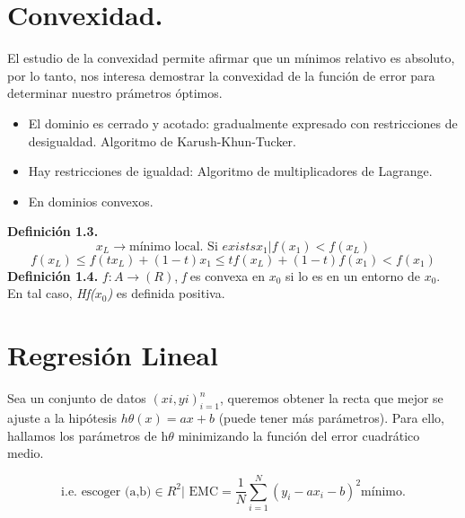 \documentclass[a4paper,10pt]{article}
\begin{document}
\section{Convexidad.}
\noindent
El estudio de la convexidad permite afirmar que un mínimos relativo es absoluto, por lo tanto, nos interesa demostrar la convexidad de la función de error para determinar nuestro prámetros óptimos.

\begin{itemize}
\item El dominio es cerrado y acotado: gradualmente expresado con restricciones de desigualdad. Algoritmo de Karush-Khun-Tucker.
\item Hay restricciones de igualdad: Algoritmo de multiplicadores de Lagrange.
\item En dominios convexos.
\end{itemize}
\textbf{Definición 1.3.} 
\[x_{L} \rightarrow \text{mínimo local. Si } exists x_{1} |  f(x_{1}) < f(x_{L})\]
\[f(x_{L})\leq f(tx_{L})+(1-t)x_{1}\leq tf(x_{L})+(1-t)f(x_{1})<f(x_{1})\]
\textbf{Definición 1.4.}
$\textit{f}: \textit{A}\rightarrow (R)$, \textit{f} es convexa en $x_{0}$ si lo es en un entorno de $x_{0}$. En tal caso, \textit{Hf($x_{0}$)} es definida positiva.
\section{Regresión Lineal}
\noindent
Sea un conjunto de datos $(xi,yi)^n_{i=1}$, queremos obtener la recta  que mejor se ajuste a la hipótesis $h\theta(x)= ax+b$ (puede tener  más parámetros). Para ello, hallamos los parámetros de h$\theta$  minimizando la función del error cuadrático medio.

\[ \text{i.e. escoger (a,b)} \in R^2 | \text{ EMC} = \frac{1}{N} \sum_{i=1}^{N}(y_{i}-ax_{i}-b)^2 \text{mínimo.} \]
\end{document}
